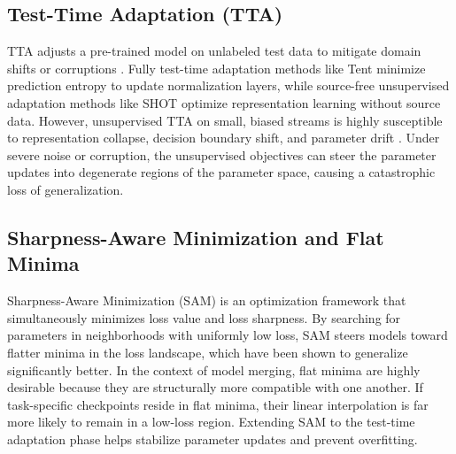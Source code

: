\documentclass{article}
\begin{document}
\subsection{Test-Time Adaptation (TTA)}
TTA adjusts a pre-trained model on unlabeled test data to mitigate domain shifts or corruptions \cite{wang2021tent, liang2020shot}. Fully test-time adaptation methods like Tent \cite{wang2021tent} minimize prediction entropy to update normalization layers, while source-free unsupervised adaptation methods like SHOT \cite{liang2020shot} optimize representation learning without source data. However, unsupervised TTA on small, biased streams is highly susceptible to representation collapse, decision boundary shift, and parameter drift \cite{shao2020control, goyal2022tentative}. Under severe noise or corruption, the unsupervised objectives can steer the parameter updates into degenerate regions of the parameter space, causing a catastrophic loss of generalization.

\subsection{Sharpness-Aware Minimization and Flat Minima}
Sharpness-Aware Minimization (SAM) \cite{foret2021sam} is an optimization framework that simultaneously minimizes loss value and loss sharpness. By searching for parameters in neighborhoods with uniformly low loss, SAM steers models toward flatter minima in the loss landscape, which have been shown to generalize significantly better. In the context of model merging, flat minima are highly desirable because they are structurally more compatible with one another. If task-specific checkpoints reside in flat minima, their linear interpolation is far more likely to remain in a low-loss region. Extending SAM to the test-time adaptation phase helps stabilize parameter updates and prevent overfitting.
\end{document}
